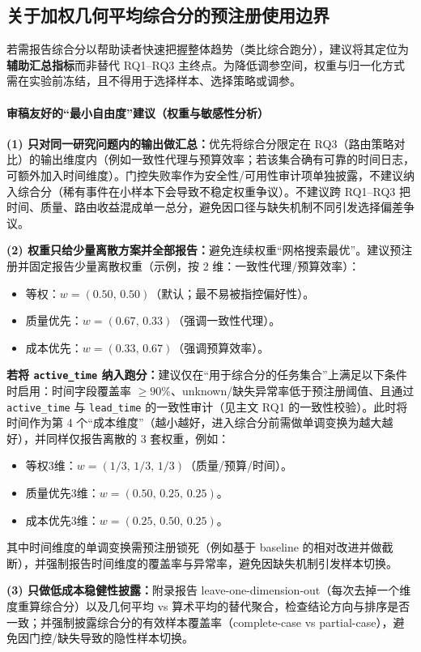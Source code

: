\subsection{关于加权几何平均综合分的预注册使用边界}

若需报告综合分以帮助读者快速把握整体趋势（类比综合跑分），建议将其定位为\textbf{辅助汇总指标}而非替代 RQ1--RQ3 主终点。为降低调参空间，权重与归一化方式需在实验前冻结，且不得用于选择样本、选择策略或调参。

\paragraph{审稿友好的“最小自由度”建议（权重与敏感性分析）}
\textbf{(1) 只对同一研究问题内的输出做汇总：}优先将综合分限定在 RQ3（路由策略对比）的输出维度内（例如一致性代理与预算效率；若该集合确有可靠的时间日志，可额外加入时间维度）。门控失败率作为安全性/可用性审计项单独披露，不建议纳入综合分（稀有事件在小样本下会导致不稳定权重争议）。不建议跨 RQ1--RQ3 把时间、质量、路由收益混成单一总分，避免因口径与缺失机制不同引发选择偏差争议。

	\textbf{(2) 权重只给少量离散方案并全部报告：}避免连续权重“网格搜索最优”。建议预注册并固定报告少量离散权重（示例，按 2 维：一致性代理/预算效率）：
\begin{itemize}
	\item 等权：$w=(0.50,\,0.50)$（默认；最不易被指控偏好性）。
	\item 质量优先：$w=(0.67,\,0.33)$（强调一致性代理）。
	\item 成本优先：$w=(0.33,\,0.67)$（强调预算效率）。
\end{itemize}
\textbf{若将 \texttt{active\_time} 纳入跑分：}建议仅在“用于综合分的任务集合”上满足以下条件时启用：时间字段覆盖率 $\ge 90\%$、unknown/缺失异常率低于预注册阈值、且通过 \texttt{active\_time} 与 \texttt{lead\_time} 的一致性审计（见主文 RQ1 的一致性校验）。此时将时间作为第 4 个“成本维度”（越小越好，进入综合分前需做单调变换为越大越好），并同样仅报告离散的 3 套权重，例如：
\begin{itemize}
	\item 等权3维：$w=(1/3,\,1/3,\,1/3)$（质量/预算/时间）。
	\item 质量优先3维：$w=(0.50,\,0.25,\,0.25)$。
	\item 成本优先3维：$w=(0.25,\,0.50,\,0.25)$。
\end{itemize}
其中时间维度的单调变换需预注册锁死（例如基于 baseline 的相对改进并做截断），并强制报告时间维度的覆盖率与异常率，避免因缺失机制引发样本切换。

\textbf{(3) 只做低成本稳健性披露：}附录报告 leave-one-dimension-out（每次去掉一个维度重算综合分）以及几何平均 vs 算术平均的替代聚合，检查结论方向与排序是否一致；并强制披露综合分的有效样本覆盖率（complete-case vs partial-case），避免因门控/缺失导致的隐性样本切换。